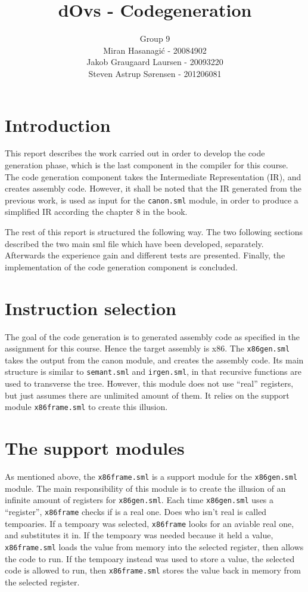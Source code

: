 \documentclass{article}
\title{dOvs - Codegeneration}
\author{
  Group 9 \\
  Miran Hasanagi\'{c} - 20084902 \\
  Jakob Graugaard Laursen - 20093220\\
  Steven Astrup S\o rensen - 201206081
}
\begin{document}
\maketitle

\section{Introduction}
This report describes the work carried out in order to develop the code generation phase, which is the last component in the compiler for this course. The code generation component takes the Intermediate Representation (IR), and creates assembly code. However, it shall be noted that the IR generated from the previous work, is used as input for the \texttt{canon.sml} module, in order to produce a simplified IR according the chapter 8 in the book.

The rest of this report is structured the following way. The two following sections described the two main sml file which have been developed, separately. Afterwards the experience gain and different tests are presented. Finally, the implementation of the code generation component is concluded.


\section{Instruction selection}

The goal of the code generation is to generated assembly code as specified in the assignment for this course. Hence the target assembly is x86. The \texttt{x86gen.sml} takes the output from the canon module, and creates the assembly code. Its main structure is similar to \texttt{semant.sml} and \texttt{irgen.sml}, in that recursive functions are used to transverse the tree. However, this module does not use ``real'' registers, but just assumes there are unlimited amount of them. It relies on the support module \texttt{x86frame.sml} to create this illusion.

\section{The support modules}
As mentioned above, the \texttt{x86frame.sml} is a support module for the \texttt{x86gen.sml} module. The main responsibility of this module is to create the illusion of an infinite amount of registers for \texttt{x86gen.sml}. Each time \texttt{x86gen.sml} uses a ``register'', \texttt{x86frame} checks if is a real one. Does who isn't real is called tempoaries. If a tempoary was selected, \texttt{x86frame} looks for an aviable real one, and substitutes it in. If the tempoary was needed because it held a value, \texttt{x86frame.sml} loads the value from memory into the selected register, then allows the code to run. If the tempoary instead was used to store a value, the selected code is allowed to run, then \texttt{x86frame.sml} stores the value back in memory from the selected register. 
\end{document}
